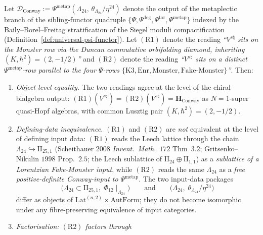 \begin{theorem}
\label{thm:bkm-conway-row-reconciliation}
Let $\mathcal{D}_{\mathrm{Conway}} :=
\Psi^{\mathrm{metap}}(\Lambda_{24},\,
\theta_{\Lambda_{24}}/\eta^{24})$
denote the output of the metaplectic branch of the
sibling-functor quadruple
$\{\Psi,\Psi^{\deg},\Psi^{\mathrm{tor}},\Psi^{\mathrm{metap}}\}$
indexed by the Baily--Borel--Freitag stratification of the
Siegel moduli compactification
(Definition~\ref{def:universal-psi-functor}).
Let $(\mathrm{R1})$ denote the reading
\emph{``$V^{s\natural}$ sits on the Monster row via the Duncan
commutative orbifolding diamond, inheriting
$(K,\hbar^2) = (2,-1/2)$''}
and $(\mathrm{R2})$ denote the reading
\emph{``$V^{s\natural}$ sits on a distinct $\Psi^{\mathrm{metap}}$-row
parallel to the four $\Psi$-rows
$\{\mathrm{K3},\mathrm{Enr},\mathrm{Monster},\mathrm{Fake\text{-}Monster}\}$''}.
Then:
\begin{enumerate}[label=\textup{(\arabic*)}]
\item \emph{Object-level equality.}
The two readings agree at the level of the chiral-bialgebra
output:
$(\mathrm{R1})(V^{s\natural}) = (\mathrm{R2})(V^{s\natural}) =
\mathbf{H}_{\mathrm{Conway}}$
as $N{=}1$-super quasi-Hopf algebras, with common Lusztig pair
$(K,\hbar^2) = (2,-1/2)$.
\item \emph{Defining-data inequivalence.}
$(\mathrm{R1})$ and $(\mathrm{R2})$ are \emph{not} equivalent at the
level of defining input data: $(\mathrm{R1})$ reads the Leech
lattice through the chain
$\Lambda_{24}\hookrightarrow\mathrm{II}_{25,1}$
\textup{(}Scheithauer $2008$ \emph{Invent.~Math.}~$172$ Thm~$3.2$;
Gritsenko--Nikulin $1998$ Prop.~$2.5$; the Leech sublattice of
$\mathrm{II}_{24}\oplus\mathrm{II}_{1,1}$\textup{)} as a
\emph{sublattice of a Lorentzian Fake-Monster input}, while
$(\mathrm{R2})$ reads the same $\Lambda_{24}$ as a
\emph{free positive-definite Conway-input to} $\Psi^{\mathrm{metap}}$.
The two input-data packages
\[
 \bigl(\Lambda_{24}\subset\mathrm{II}_{25,1},\; \Phi_{12}\!\mid_{\Lambda_{24}}\bigr)
 \qquad\text{and}\qquad
 \bigl(\Lambda_{24},\;\theta_{\Lambda_{24}}/\eta^{24}\bigr)
\]
differ as objects of $\mathrm{Lat}^{(n,2)}\times\mathrm{AutForm}$;
they do not become isomorphic under any fibre-preserving
equivalence of input categories.
\item \emph{Factorisation: $(\mathrm{R2})$ factors through
}
\end{enumerate}
\end{theorem}
